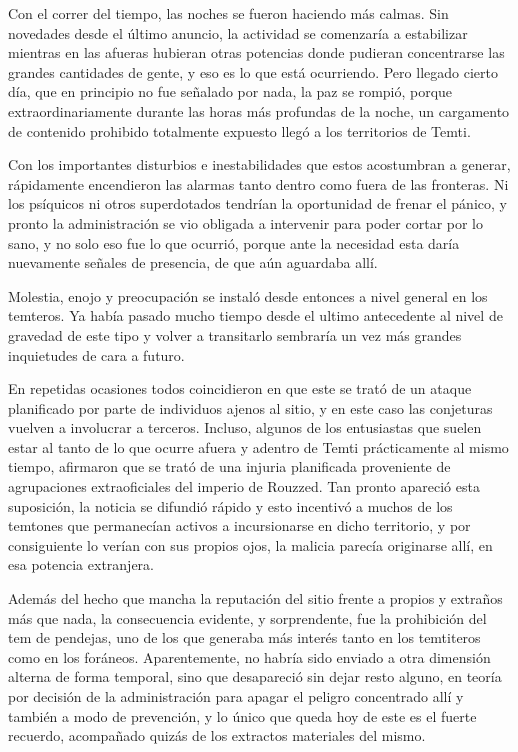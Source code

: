 \documentclass[
  spanish,
]{book}
\begin{document}
Con el correr del tiempo, las noches se fueron haciendo más calmas. Sin novedades desde el último anuncio, la actividad se comenzaría a estabilizar mientras en las afueras hubieran otras potencias donde pudieran concentrarse las grandes cantidades de gente, y eso es lo que está ocurriendo. Pero llegado cierto día, que en principio no fue señalado por nada, la paz se rompió, porque extraordinariamente durante las horas más profundas de la noche, un cargamento de contenido prohibido totalmente expuesto llegó a los territorios de Temti.

Con los importantes disturbios e inestabilidades que estos acostumbran a generar, rápidamente encendieron las alarmas tanto dentro como fuera de las fronteras. Ni los psíquicos ni otros superdotados tendrían la oportunidad de frenar el pánico, y pronto la administración se vio obligada a intervenir para poder cortar por lo sano, y no solo eso fue lo que ocurrió, porque ante la necesidad esta daría nuevamente señales de presencia, de que aún aguardaba allí.

Molestia, enojo y preocupación se instaló desde entonces a nivel general en los temteros. Ya había pasado mucho tiempo desde el ultimo antecedente al nivel de gravedad de este tipo y volver a transitarlo sembraría un vez más grandes inquietudes de cara a futuro.

En repetidas ocasiones todos coincidieron en que este se trató de un ataque planificado por parte de individuos ajenos al sitio, y en este caso las conjeturas vuelven a involucrar a terceros. Incluso, algunos de los entusiastas que suelen estar al tanto de lo que ocurre afuera y adentro de Temti prácticamente al mismo tiempo, afirmaron que se trató de una injuria planificada proveniente de agrupaciones extraoficiales del imperio de Rouzzed. Tan pronto apareció esta suposición, la noticia se difundió rápido y esto incentivó a muchos de los temtones que permanecían activos a incursionarse en dicho territorio, y por consiguiente lo verían con sus propios ojos, la malicia parecía originarse allí, en esa potencia extranjera.

Además del hecho que mancha la reputación del sitio frente a propios y extraños más que nada, la consecuencia evidente, y sorprendente, fue la prohibición del tem de pendejas, uno de los que generaba más interés tanto en los temtiteros como en los foráneos. Aparentemente, no habría sido enviado a otra dimensión alterna de forma temporal, sino que desapareció sin dejar resto alguno, en teoría por decisión de la administración para apagar el peligro concentrado allí y también a modo de prevención, y lo único que queda hoy de este es el fuerte recuerdo, acompañado quizás de los extractos materiales del mismo.
\end{document}
